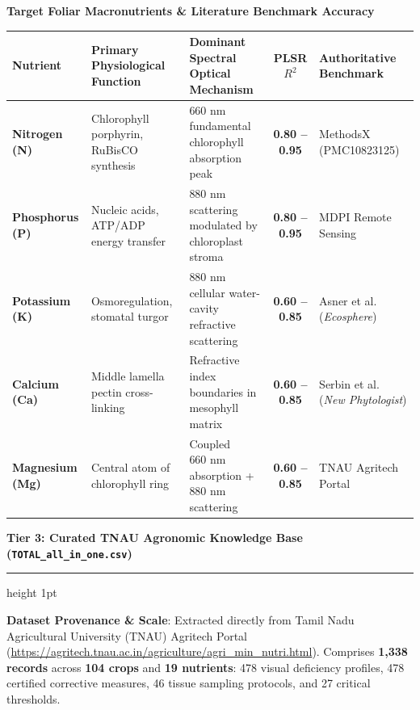 \documentclass[11pt,a4paper,landscape]{article}
\begin{document}
\vspace{0.4cm}
\begin{center}
\textbf{\large Target Foliar Macronutrients \& Literature Benchmark Accuracy} \\[4pt]
\small
\begin{tabularx}{\textwidth}{l p{4.5cm} p{5.5cm} c l}
\toprule
\textbf{Nutrient} & \textbf{Primary Physiological Function} & \textbf{Dominant Spectral Optical Mechanism} & \textbf{PLSR $R^2$} & \textbf{Authoritative Benchmark} \\
\midrule
\textbf{Nitrogen (N)} & Chlorophyll porphyrin, RuBisCO synthesis & $660\text{ nm}$ fundamental chlorophyll absorption peak & \textbf{0.80 -- 0.95} & MethodsX (PMC10823125)~\cite{methodsx2024coffee} \\
\textbf{Phosphorus (P)} & Nucleic acids, ATP/ADP energy transfer & $880\text{ nm}$ scattering modulated by chloroplast stroma & \textbf{0.80 -- 0.95} & MDPI Remote Sensing~\cite{zhang2022spad} \\
\textbf{Potassium (K)} & Osmoregulation, stomatal turgor & $880\text{ nm}$ cellular water-cavity refractive scattering & \textbf{0.60 -- 0.85} & Asner et al. (\textit{Ecosphere}) \\
\textbf{Calcium (Ca)} & Middle lamella pectin cross-linking & Refractive index boundaries in mesophyll matrix & \textbf{0.60 -- 0.85} & Serbin et al. (\textit{New Phytologist}) \\
\textbf{Magnesium (Mg)} & Central atom of chlorophyll ring & Coupled $660\text{ nm}$ absorption + $880\text{ nm}$ scattering & \textbf{0.60 -- 0.85} & TNAU Agritech Portal~\cite{tnau2024portal} \\
\bottomrule
\end{tabularx}
\end{center}

\newpage
\begin{center}
    {\Large \textbf{\color{primary} Tier 3: Curated TNAU Agronomic Knowledge Base (\texttt{TOTAL\_all\_in\_one.csv})}}
\end{center}
\vspace{0.2cm}
\hrule height 1pt \color{primary}
\vspace{0.3cm}

\begin{tcolorbox}[colback=primary!5!white,colframe=primary,arc=2mm]
\textbf{Dataset Provenance \& Scale}: Extracted directly from Tamil Nadu Agricultural University (TNAU) Agritech Portal (\url{https://agritech.tnau.ac.in/agriculture/agri_min_nutri.html}).
Comprises \textbf{1,338 records} across \textbf{104 crops} and \textbf{19 nutrients}: 478 visual deficiency profiles, 478 certified corrective measures, 46 tissue sampling protocols, and 27 critical thresholds.
\end{tcolorbox}
\end{document}
